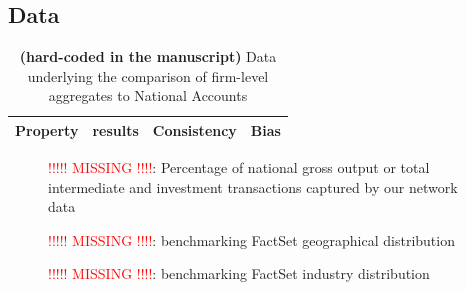 \documentclass[11pt]{article}
\begin{document}
\FloatBarrier
\begin{appendices}



\FloatBarrier
\section{Data}

%

\begin{table}[!htpb]
\begin{center}
\caption{\textbf{(hard-coded in the manuscript)}  Data underlying the comparison of firm-level aggregates to National Accounts}
\begin{tabular}{cccc}
\hline
Property & results & Consistency & Bias \\
\hline
\end{tabular}
\end{center}
\end{table}

\begin{figure}[!htpb]
\centering
\caption{\textcolor{red}{!!!!! MISSING !!!!}: Percentage of national gross output or total intermediate and investment transactions captured by our network data}
\label{fig:}
\end{figure}

\begin{figure}[!htpb]
\centering
\caption{\textcolor{red}{!!!!! MISSING !!!!}: benchmarking FactSet  geographical distribution}
\label{fig:factset_geo_listed}
\end{figure}

\begin{figure}[!htpb]
\centering
\caption{\textcolor{red}{!!!!! MISSING !!!!}: benchmarking FactSet industry distribution}
\label{fig:factset_geo_listed}
\end{figure}


\end{appendices}
\end{document}

